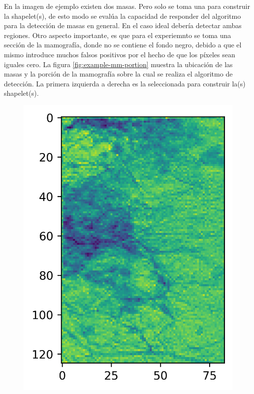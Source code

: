 En la imagen de ejemplo existen dos masas. Pero solo se toma una para construir la shapelet(s), de esto modo se evalúa
la capacidad de responder del algoritmo para la detección de masas en general. En el caso ideal debería detectar ambas
regiones. Otro aspecto importante, es que para el experiemnto se toma una sección de la mamografía, donde no se contiene
el fondo negro, debido a que el mismo introduce muchos falsos positivos por el hecho de que los píxeles sean iguales 
cero. La figura \ref{fig:example-mm-portion} muestra la ubicación de las masas y la porción de la mamografía sobre
la cual se realiza el algoritmo de detección. La primera izquierda a derecha es la seleccionada para construir
la(s) shapelet(s).

\begin{figure}
\begin{multicols}{2}
    \includegraphics[width=\linewidth]{Graphics/mm-aprox.png}\par 

\end{multicols}
\end{figure}
